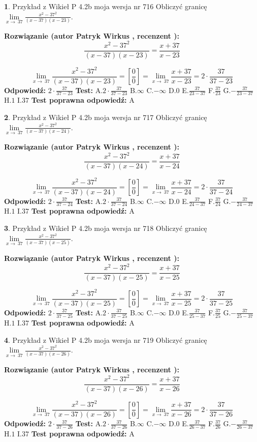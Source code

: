 \documentclass[12pt, a4paper]{article}
\theoremstyle{definition} %
\newtheorem{zad}{}
\newcommand{\zadStart}[1]{\begin{zad}#1\newline}
\newcommand{\zadStop}{\end{zad}}
\newcommand{\rozwStart}[2]{\noindent \textbf{Rozwiązanie (autor #1 , recenzent #2): }\newline}
\newcommand{\rozwStop}{\newline}
\newcommand{\odpStart}{\noindent \textbf{Odpowiedź:}\newline}
\newcommand{\odpStop}{\newline}
\newcommand{\testStart}{\noindent \textbf{Test:}\newline}
\newcommand{\testStop}{\newline}
\newcommand{\kluczStart}{\noindent \textbf{Test poprawna odpowiedź:}\newline}
\newcommand{\kluczStop}{\newline}
\begin{document}
\zadStart{Przykład z Wikieł P 4.2b moja wersja nr 716}
Obliczyć granicę $\lim\limits_{x\to\ 37}\frac{x^{2}-37^{2}}{(x-37)(x-23)}$.
\zadStop
\rozwStart{Patryk Wirkus}{}
$$\frac{x^{2}-37^{2}}{(x-37)(x-23)}=\frac{x+37}{x-23}$$

$$\lim\limits_{x\to\ 37}\frac{x^{2}-37^{2}}{(x-37)(x-23)}=[\frac{0}{0}]=\lim\limits_{x\to\ 37}\frac{x+37}{x-23}=2 \cdot \frac{37}{37-23}$$
\rozwStop
\odpStart
$2 \cdot \frac{37}{37-23}$
\odpStop
\testStart
A.$2 \cdot \frac{37}{37-23}$
B.$\infty$
C.$-\infty$
D.$0$
E.$\frac{37}{23-37}$
F.$\frac{37}{23}$
G.$-\frac{37}{23-37}$
H.$1$
I.$37$
\testStop
\kluczStart
A
\kluczStop



\zadStart{Przykład z Wikieł P 4.2b moja wersja nr 717}
Obliczyć granicę $\lim\limits_{x\to\ 37}\frac{x^{2}-37^{2}}{(x-37)(x-24)}$.
\zadStop
\rozwStart{Patryk Wirkus}{}
$$\frac{x^{2}-37^{2}}{(x-37)(x-24)}=\frac{x+37}{x-24}$$

$$\lim\limits_{x\to\ 37}\frac{x^{2}-37^{2}}{(x-37)(x-24)}=[\frac{0}{0}]=\lim\limits_{x\to\ 37}\frac{x+37}{x-24}=2 \cdot \frac{37}{37-24}$$
\rozwStop
\odpStart
$2 \cdot \frac{37}{37-24}$
\odpStop
\testStart
A.$2 \cdot \frac{37}{37-24}$
B.$\infty$
C.$-\infty$
D.$0$
E.$\frac{37}{24-37}$
F.$\frac{37}{24}$
G.$-\frac{37}{24-37}$
H.$1$
I.$37$
\testStop
\kluczStart
A
\kluczStop



\zadStart{Przykład z Wikieł P 4.2b moja wersja nr 718}
Obliczyć granicę $\lim\limits_{x\to\ 37}\frac{x^{2}-37^{2}}{(x-37)(x-25)}$.
\zadStop
\rozwStart{Patryk Wirkus}{}
$$\frac{x^{2}-37^{2}}{(x-37)(x-25)}=\frac{x+37}{x-25}$$

$$\lim\limits_{x\to\ 37}\frac{x^{2}-37^{2}}{(x-37)(x-25)}=[\frac{0}{0}]=\lim\limits_{x\to\ 37}\frac{x+37}{x-25}=2 \cdot \frac{37}{37-25}$$
\rozwStop
\odpStart
$2 \cdot \frac{37}{37-25}$
\odpStop
\testStart
A.$2 \cdot \frac{37}{37-25}$
B.$\infty$
C.$-\infty$
D.$0$
E.$\frac{37}{25-37}$
F.$\frac{37}{25}$
G.$-\frac{37}{25-37}$
H.$1$
I.$37$
\testStop
\kluczStart
A
\kluczStop



\zadStart{Przykład z Wikieł P 4.2b moja wersja nr 719}
Obliczyć granicę $\lim\limits_{x\to\ 37}\frac{x^{2}-37^{2}}{(x-37)(x-26)}$.
\zadStop
\rozwStart{Patryk Wirkus}{}
$$\frac{x^{2}-37^{2}}{(x-37)(x-26)}=\frac{x+37}{x-26}$$

$$\lim\limits_{x\to\ 37}\frac{x^{2}-37^{2}}{(x-37)(x-26)}=[\frac{0}{0}]=\lim\limits_{x\to\ 37}\frac{x+37}{x-26}=2 \cdot \frac{37}{37-26}$$
\rozwStop
\odpStart
$2 \cdot \frac{37}{37-26}$
\odpStop
\testStart
A.$2 \cdot \frac{37}{37-26}$
B.$\infty$
C.$-\infty$
D.$0$
E.$\frac{37}{26-37}$
F.$\frac{37}{26}$
G.$-\frac{37}{26-37}$
H.$1$
I.$37$
\testStop
\kluczStart
A
\kluczStop
\end{document}

